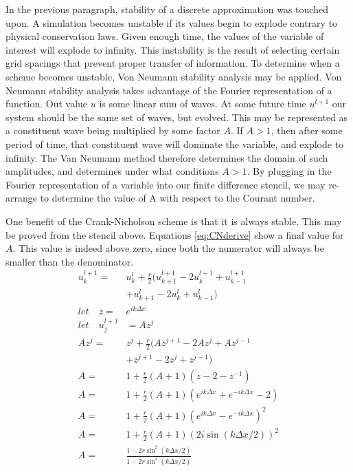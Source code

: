 \documentclass[twocolumn]{article}
\begin{document}
In the previous paragraph, stability of a discrete approximation was touched upon. A simulation becomes unstable if its values begin to explode contrary to physical conservation laws. Given enough time, the values of the variable of interest will explode to infinity. This instability is the result of selecting certain grid spacings that prevent proper transfer of information. To determine when a scheme becomes unstable, Von Neumann stability analysis may be applied. Von Neumann stability analysis takes advantage of the Fourier representation of a function. Out value $u$ is some linear sum of waves. At some future time $u^{l+1}$ our system should be the same set of waves, but evolved. This may be represented as a constituent wave being multiplied by some factor $A$. If $A>1$, then after some period of time, that constituent wave will dominate the variable, and explode to infinity. The Van Neumann method therefore determines the domain of such amplitudes, and determines under what conditions $A>1$. By plugging in the Fourier representation of a variable into our finite difference stencil, we may re-arrange to determine the value of A with respect to the Courant number.

One benefit of the Crank-Nicholson scheme is that it is always stable. This may be proved from the stencil above. Equations \ref{eq:CNderive} show a final value for $A$. This value is indeed above zero, since both the numerator will always be smaller than the denominator.
\begin{equation}
\begin{split}
u_{k}^{l+1} =& u_k^l +\frac{r}{2}(u_{k+1}^{l+1} - 2u_k^{l+1} +u_{k-1}^{l+1} \\
             & + u_{k+1}^l -2u_k^l + u_{k-1}^l)  \\
let \quad z =& e^{ik\Delta x} \\
let \quad u_{j}^{l+1}& = Az^j \\
Az^j =& z^j + \frac{r}{2} (Az^{j+1} -2Az^j +Az^{j-1}\\
      & +z^{j+1} -2z^j + z^{j-1}) \\
A =& 1 + \frac{r}{2} (A+1)(z - 2 - z^{-1}) \\
A =& 1 + \frac{r}{2} (A+1)(e^{ik\Delta x} + e^{-ik\Delta x} - 2) \\
A =& 1 + \frac{r}{2} (A+1)(e^{ik\Delta x} - e^{-ik\Delta x})^2 \\
A =& 1 + \frac{r}{2} (A+1)(2i \sin(k\Delta x/2))^2 \\
A =& \frac{1 - 2r \sin^2(k\Delta x/2)}{1 - 2r \sin^2(k\Delta x/2)}
\end{split} \label{eq:CNderive}
\end{equation}
\end{document}
